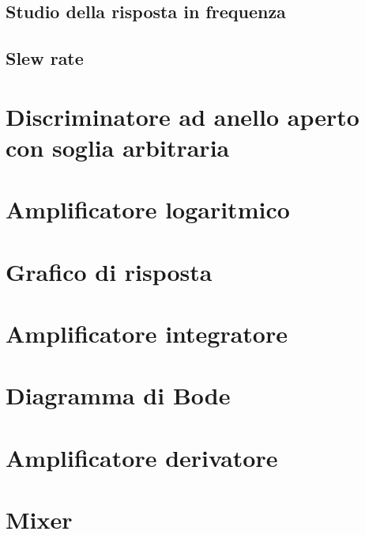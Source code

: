 \documentclass[journal]{IEEEtran}
\begin{document}
\subsection{Studio della risposta in frequenza}

\subsection{Slew rate}

\section{Discriminatore ad anello aperto con soglia arbitraria} %


\section{Amplificatore logaritmico} %


\section{Grafico di risposta}


\section{Amplificatore integratore} %


\section{Diagramma di Bode}


\section{Amplificatore derivatore} %


\section{Mixer} %
\end{document}
